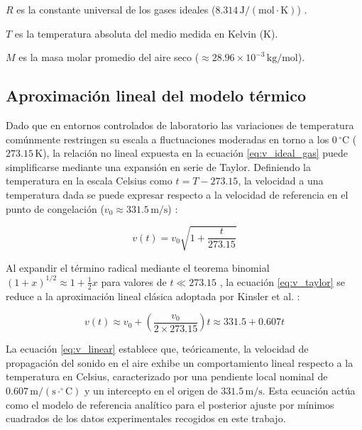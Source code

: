 \documentclass[conference]{IEEEtran}
\begin{document}
$R$ es la constante universal de los gases ideales ($8.314\,\text{J}/(\text{mol}\cdot\text{K})$) \cite{holman2011}.

$T$ es la temperatura absoluta del medio medida en Kelvin ($\text{K}$).

$M$ es la masa molar promedio del aire seco ($\approx 28.96 \times 10^{-3}\,\text{kg}/\text{mol}$).

\subsection{Aproximación lineal del modelo térmico}

Dado que en entornos controlados de laboratorio las variaciones de temperatura comúnmente restringen su escala a fluctuaciones moderadas en torno a los $0\,^{\circ}\text{C}$ ($273.15\,\text{K}$), la relación no lineal expuesta en la ecuación \eqref{eq:v_ideal_gas} puede simplificarse mediante una expansión en serie de Taylor. Definiendo la temperatura en la escala Celsius como $t = T - 273.15$, la velocidad a una temperatura dada se puede expresar respecto a la velocidad de referencia en el punto de congelación ($v_0 \approx 331.5\,\text{m/s}$) \cite[p.~121, Ec.~5.6.6]{kinsler2000}:

\begin{equation}
v(t) = v_0 \sqrt{1 + \frac{t}{273.15}}
\label{eq:v_taylor}
\end{equation}

Al expandir el término radical mediante el teorema binomial $(1 + x)^{1/2} \approx 1 + \frac{1}{2}x$ para valores de $t \ll 273.15$ \cite{thomas2010}, la ecuación \eqref{eq:v_taylor} se reduce a la aproximación lineal clásica adoptada por Kinsler et al. \cite{kinsler2000}:

\begin{equation}
v(t) \approx v_0 + \left( \frac{v_0}{2 \times 273.15} \right) t \approx 331.5 + 0.607 t
\label{eq:v_linear}
\end{equation}

La ecuación \eqref{eq:v_linear} establece que, teóricamente, la velocidad de propagación del sonido en el aire exhibe un comportamiento lineal respecto a la temperatura en Celsius, caracterizado por una pendiente local nominal de $0.607\,\text{m}/(\text{s}\cdot^{\circ}\text{C})$ y un intercepto en el origen de $331.5\,\text{m/s}$. Esta ecuación actúa como el modelo de referencia analítico para el posterior ajuste por mínimos cuadrados de los datos experimentales recogidos en este trabajo.
\end{document}
